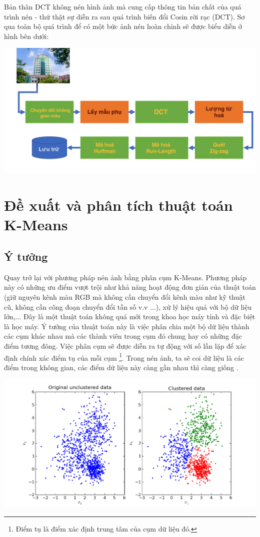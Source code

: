 \documentclass[12pt,a4paper]{article}
\begin{document}
Bản thân DCT không nén hình ảnh mà cung cấp thông tin bản chất của quá trình nén - thứ thật sự diễn ra sau quá trình biến đổi Cosin rời rạc (DCT). Sơ qua toàn bộ quá trình để có một bức ảnh nén hoàn chỉnh sẽ được biểu diễn ở hình bên dưới:
\begin{center}
\includegraphics[scale=0.25]{imagecompressprocess.png}
\end{center}
\newpage
\section{Đề xuất và phân tích thuật toán K-Means }
\subsection{Ý tưởng}

Quay trở lại với phương pháp nén ảnh bằng phân cụm K-Means. Phương pháp này có những ưu điểm vượt trội như khả năng hoạt động đơn giản của thuật toán (giữ nguyên kênh màu RGB mà không cần chuyển đổi kênh màu như kỹ thuật cũ, không cần công đoạn chuyển đổi tần số v.v ...), xử lý hiệu quả với bộ dữ liệu lớn,...  Đây là một thuật toán không quá mới trong khoa học máy tính và đặc biệt là học máy. Ý tưởng của thuật toán này là việc phân chia một bộ dữ liệu thành các cụm khác nhau mà các thành viên trong cụm đó chung hay có những đặc điểm tương đông. Việc phân cụm sẽ được diễn ra tự động với số lần lặp để xác định chính xác điểm tụ của mỗi cụm \footnote{Điểm tụ là điểm xác định trung tâm của cụm dữ liệu đó. }. Trong nén ảnh, ta sẽ coi dữ liệu là các điểm trong không gian, các điểm dữ liệu này càng gần nhau thì càng giống .
\begin{center}
\includegraphics[scale=0.45]{kmean1.png}
\end{center}
\end{document}
